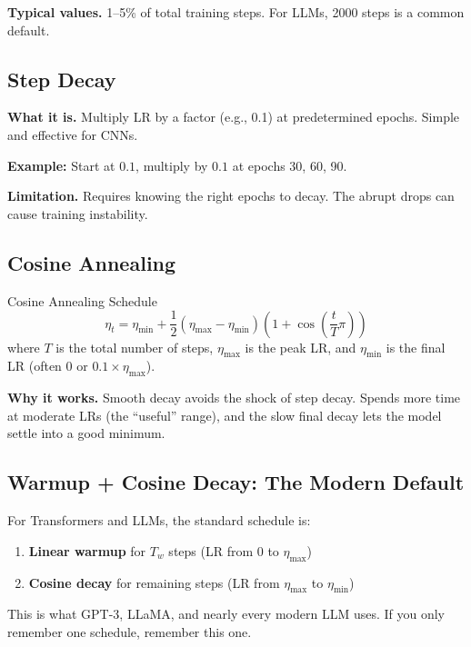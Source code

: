 \textbf{Typical values.} 1--5\% of total training steps. For LLMs, 2000 steps is a common default.

\subsection{Step Decay}

\textbf{What it is.} Multiply LR by a factor (e.g., 0.1) at predetermined epochs. Simple and effective for CNNs.

\textbf{Example:} Start at $0.1$, multiply by $0.1$ at epochs 30, 60, 90.

\textbf{Limitation.} Requires knowing the right epochs to decay. The abrupt drops can cause training instability.

\subsection{Cosine Annealing}

\begin{mathresult}{Cosine Annealing Schedule}
\begin{equation}
\eta_t = \eta_{\min} + \frac{1}{2}(\eta_{\max} - \eta_{\min})\left(1 + \cos\left(\frac{t}{T}\pi\right)\right)
\end{equation}
where $T$ is the total number of steps, $\eta_{\max}$ is the peak LR, and $\eta_{\min}$ is the final LR (often $0$ or $0.1 \times \eta_{\max}$).
\end{mathresult}

\textbf{Why it works.} Smooth decay avoids the shock of step decay. Spends more time at moderate LRs (the ``useful'' range), and the slow final decay lets the model settle into a good minimum.

\subsection{Warmup + Cosine Decay: The Modern Default}

For Transformers and LLMs, the standard schedule is:
\begin{enumerate}
    \item \textbf{Linear warmup} for $T_w$ steps (LR from 0 to $\eta_{\max}$)
    \item \textbf{Cosine decay} for remaining steps (LR from $\eta_{\max}$ to $\eta_{\min}$)
\end{enumerate}

This is what GPT-3, LLaMA, and nearly every modern LLM uses. If you only remember one schedule, remember this one.

